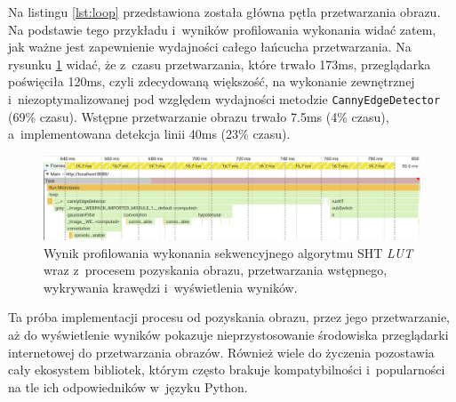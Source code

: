 Na listingu \ref{lst:loop} przedstawiona została główna pętla przetwarzania obrazu. Na podstawie tego przykładu i~wyników profilowania wykonania widać zatem, jak ważne jest zapewnienie wydajności całego łańcucha przetwarzania. Na rysunku \ref{fig:road-profiler} widać, że z~czasu przetwarzania, które trwało 173ms, przeglądarka poświęciła 120ms, czyli zdecydowaną większość, na wykonanie zewnętrznej i~niezoptymalizowanej pod względem wydajności metodzie \lstinline{CannyEdgeDetector} (69\% czasu). Wstępne przetwarzanie obrazu trwało 7.5ms (4\% czasu), a~implementowana detekcja linii 40ms (23\% czasu).

\begin{figure}[h]
    \centering
    \includegraphics[width=\linewidth]{img/road-profiler.png}
    \caption{Wynik profilowania wykonania sekwencyjnego algorytmu SHT \textit{LUT} wraz z~procesem pozyskania obrazu, przetwarzania wstępnego, wykrywania krawędzi i~wyświetlenia wyników.}
    \label{fig:road-profiler}
\end{figure}

Ta próba implementacji procesu od pozyskania obrazu, przez jego przetwarzanie, aż do wyświetlenie wyników pokazuje nieprzystosowanie środowiska przeglądarki internetowej do przetwarzania obrazów. Również wiele do życzenia pozostawia cały ekosystem bibliotek, którym często brakuje kompatybilności i~popularności na tle ich odpowiedników w~języku Python. 
